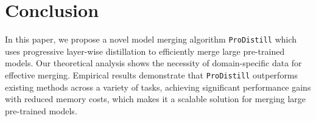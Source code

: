 \section{Conclusion}

In this paper, we propose a novel model merging algorithm \texttt{ProDistill} which uses progressive layer-wise distillation to efficiently merge large pre-trained models. Our theoretical analysis shows the necessity of domain-specific data for effective merging. Empirical results demonstrate that \texttt{ProDistill} outperforms existing methods across a variety of tasks, achieving significant performance gains with reduced memory costs, which makes it a scalable solution for merging large pre-trained models.
